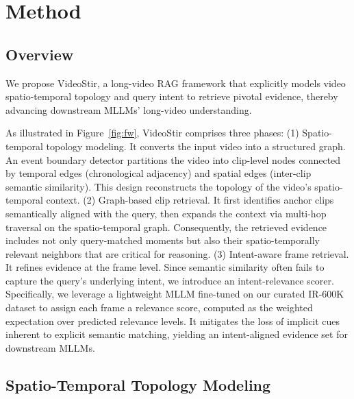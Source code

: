 \section{Method}
\subsection{Overview}
We propose VideoStir, a long-video RAG framework that explicitly models video spatio-temporal topology and query intent to retrieve pivotal evidence, thereby advancing downstream MLLMs’ long-video understanding. 

As illustrated in Figure~\ref{fig:fw}, VideoStir comprises three phases: (1) Spatio-temporal topology modeling. It converts the input video into a structured graph. An event boundary detector partitions the video into clip-level nodes connected by temporal edges (chronological adjacency) and spatial edges (inter-clip semantic similarity). This design reconstructs the topology of the video’s spatio-temporal context. (2) Graph-based clip retrieval. It first identifies anchor clips semantically aligned with the query, then expands the context via multi-hop traversal on the spatio-temporal graph. Consequently, the retrieved evidence includes not only query-matched moments but also their spatio-temporally relevant neighbors that are critical for reasoning. (3) Intent-aware frame retrieval. It refines evidence at the frame level. Since semantic similarity often fails to capture the query’s underlying intent, we introduce an intent-relevance scorer. Specifically, we leverage a lightweight MLLM fine-tuned on our curated IR-600K dataset to assign each frame a relevance score, computed as the weighted expectation over predicted relevance levels. It mitigates the loss of implicit cues inherent to explicit semantic matching, yielding an intent-aligned evidence set for downstream MLLMs.

\subsection{Spatio-Temporal Topology Modeling}


